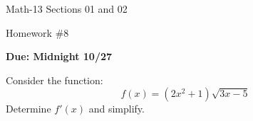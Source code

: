 \documentclass[letterpaper,12pt,fleqn]{article}
\begin{document}
\begin{center}
  \large
  Math-13 Sections 01 and 02

  \Large
  Homework \#8

  \large
  \textbf{Due: Midnight 10/27}
\end{center}

\vspace{0.5in}

Consider the function:
\[f(x)=(2x^2+1)\sqrt{3x-5}\]
Determine \(f'(x)\) and simplify.
\end{document}
